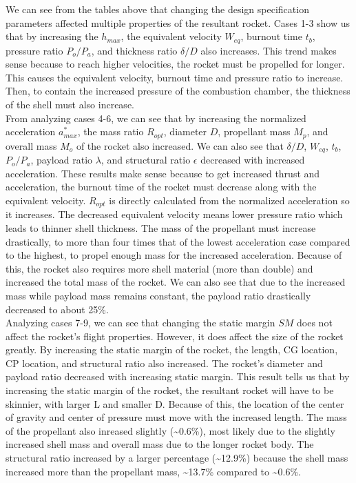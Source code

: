 \documentclass{report}
\begin{document}
\noindent We can see from the tables above that changing the design specification parameters affected multiple properties of the resultant rocket.
Cases 1-3 show us that by increasing the $h_{max}$, the equivalent velocity $W_{eq}$, burnout time $t_b$, pressure ratio $P_o/P_a$, and thickness ratio $\delta/D$ also increases.
This trend makes sense because to reach higher velocities, the rocket must be propelled for longer.
This causes the equivalent velocity, burnout time and pressure ratio to increase.
Then, to contain the increased pressure of the combustion chamber, the thickness of the shell must also increase.\\

\noindent From analyzing cases 4-6, we can see that by increasing the normalized acceleration $a^*_{max}$, the mass ratio $R_{opt}$, diameter $D$, propellant mass $M_p$, and overall mass $M_o$ of the rocket also increased.
We can also see that $\delta/D$, $W_{eq}$, $t_b$, $P_o/P_a$, payload ratio $\lambda$, and structural ratio $\epsilon$ decreased with increased acceleration.
These results make sense because to get increased thrust and acceleration, the burnout time of the rocket must decrease along with the equivalent velocity.
$R_{opt}$ is directly calculated from the normalized acceleration so it increases.
The decreased equivalent velocity means lower pressure ratio which leads to thinner shell thickness. 
The mass of the propellant must increase drastically, to more than four times that of the lowest acceleration case compared to the highest, to propel enough mass for the increased acceleration.
Because of this, the rocket also requires more shell material (more than double) and increased the total mass of the rocket.
We can also see that due to the increased mass while payload mass remains constant, the payload ratio drastically decreased to about 25\%. \\

\noindent Analyzing cases 7-9, we can see that changing the static margin $SM$ does not affect the rocket's flight properties.
However, it does affect the size of the rocket greatly. 
By increasing the static margin of the rocket, the length, CG location, CP location, and structural ratio also increased.
The rocket's diameter and payload ratio decreased with increasing static margin. 
This result tells us that by increasing the static margin of the rocket, the resultant rocket will have to be skinnier, with larger L and smaller D. 
Because of this, the location of the center of gravity and center of pressure must move with the increased length.
The mass of the propellant also inreased slightly (\textasciitilde0.6\%), most likely due to the slightly increased shell mass and overall mass due to the longer rocket body.
The structural ratio increased by a larger percentage (\textasciitilde12.9\%) because the shell mass increased more than the propellant mass, \textasciitilde13.7\% compared to \textasciitilde0.6\%.\\
\end{document}
